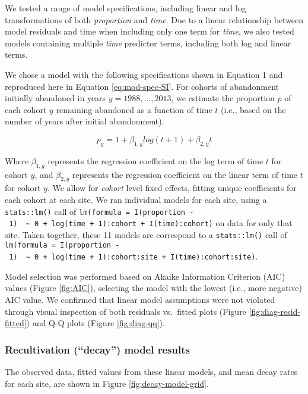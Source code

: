 \documentclass[9pt,lineno]{pnas-new}
\begin{document}
We tested a range of model specifications, including linear and log transformations of both \emph{proportion} and \emph{time}.
Due to a linear relationship between model residuals and time when including only one term for \emph{time}, we also tested models containing multiple \emph{time} predictor terms, including both log and linear terms.

We chose a model with the following specifications shown in Equation 1 and reproduced here in Equation \eqref{eq:mod-spec-SI}.
For cohorts of abandonment initially abandoned in years \(y = 1988, ... , 2013\), we estimate the proportion \(p\) of each cohort \(y\) remaining abandoned as a function of time \(t\) (i.e., based on the number of years after initial abandonment).

\begin{equation}
p_{y} = 1 + \beta_{1,y} log(t + 1) + \beta_{2,y} t \label{eq:mod-spec-SI}
\end{equation}

Where \(\beta_{1,y}\) represents the regression coefficient on the log term of time \(t\) for cohort \(y\), and \(\beta_{2,y}\) represents the regression coefficient on the linear term of time \(t\) for cohort \(y\).
We allow for \emph{cohort} level fixed effects, fitting unique coefficients for each cohort at each site.
We ran individual models for each site, using a \texttt{stats::lm()} call of \texttt{lm(formula\ =\ I(proportion\ -\ 1)\ \ \textasciitilde{}\ 0\ +\ log(time\ +\ 1):cohort\ +\ I(time):cohort)} on data for only that site.
Taken together, these 11 models are correspond to a \texttt{stats::lm()} call of \texttt{lm(formula\ =\ I(proportion\ -\ 1)\ \ \textasciitilde{}\ 0\ +\ log(time\ +\ 1):cohort:site\ +\ I(time):cohort:site)}.

Model selection was performed based on Akaike Information Criterion (AIC) values (Figure \ref{fig:AIC}), selecting the model with the lowest (i.e., more negative) AIC value.
We confirmed that linear model assumptions were not violated through visual inspection of both residuals vs.~fitted plots (Figure \ref{fig:diag-resid-fitted}) and Q-Q plots (Figure \ref{fig:diag-qq}).

\hypertarget{recultivation-decay-model-results}{%
\subsubsection{Recultivation (``decay'') model results}\label{recultivation-decay-model-results}}

The observed data, fitted values from these linear models, and mean decay rates for each site, are shown in Figure \ref{fig:decay-model-grid}.
\end{document}
